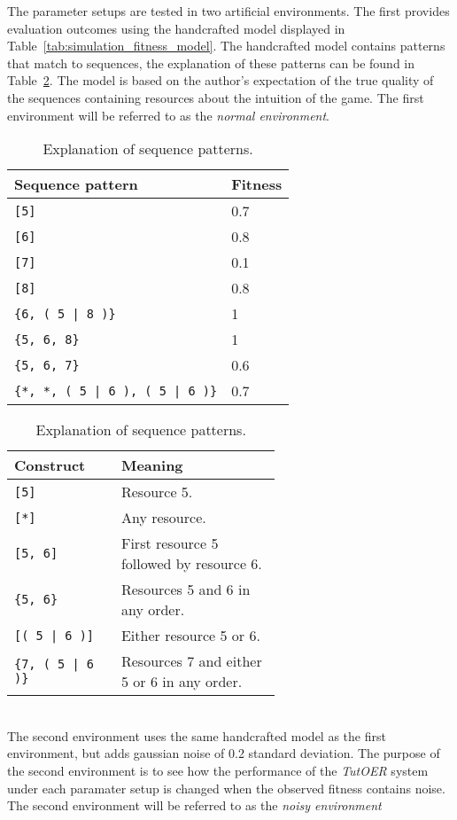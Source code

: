 \noindent
The parameter setups are tested in two artificial environments. The first
provides evaluation outcomes using the handcrafted model displayed in
Table~\ref{tab:simulation_fitness_model}. The handcrafted model contains
patterns that match to sequences, the explanation of these patterns can be
found in Table~\ref{tab:simulation_fitness_model_explanation}.
The model is based on the author's expectation of the true quality of the
sequences containing resources about the intuition of the game. The first
environment will be referred to as the \emph{normal environment}.\\
\begin{table}[h]
\begin{minipage}[t]{0.48\linewidth}
\begin{tabular}[ht]{ll}\hline
	Sequence pattern & Fitness \\\hline
	\verb![5]! & 0.7 \\
	\verb![6]! & 0.8 \\
	\verb![7]! & 0.1 \\
	\verb![8]! & 0.8 \\
	\verb!{6, ( 5 | 8 )}! & 1 \\
	\verb!{5, 6, 8}! & 1 \\
	\verb!{5, 6, 7}! & 0.6 \\
	\verb!{*, *, ( 5 | 6 ), ( 5 | 6 )}! & 0.7\\
\end{tabular}
\caption{Fitness values for each sequence.}
\label{tab:simulation_fitness_model}
\end{minipage}
\hfill
\begin{minipage}[t]{0.51\linewidth}
\begin{tabular}[ht]{lp{0.6\linewidth}}\hline
	Construct &  Meaning \\\hline
	\verb![5]! & Resource 5.\\
	\verb![*]! & Any resource.\\
	\verb![5, 6]! & First resource 5 followed by resource 6.\\
	\verb!{5, 6}! & Resources 5 and 6 in any order.\\
	\verb![( 5 | 6 )]! & Either resource 5 or 6.\\
	\verb!{7, ( 5 | 6 )}! & Resources 7 and either 5 or 6 in any order.\\
\end{tabular}
\caption{Explanation of sequence patterns.}
\label{tab:simulation_fitness_model_explanation}
\end{minipage}
\end{table}\\
\noindent
The second environment uses the same handcrafted model as the first
environment, but adds gaussian noise of 0.2 standard deviation. The purpose of
the second environment is to see how the performance of the \emph{TutOER}
system under each paramater setup is changed when the observed fitness contains
noise. The second environment will be referred to as the \emph{noisy
environment}

